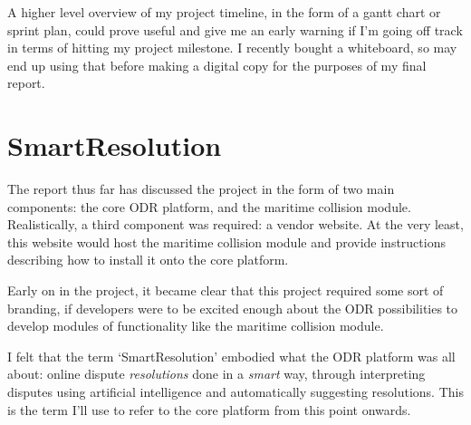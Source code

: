 A higher level overview of my project timeline, in the form of a gantt chart or sprint plan, could prove useful and give me an early warning if I'm going off track in terms of hitting my project milestone. I recently bought a whiteboard, so may end up using that before making a digital copy for the purposes of my final report.

\section{SmartResolution}

The report thus far has discussed the project in the form of two main components: the core ODR platform, and the maritime collision module. Realistically, a third component was required: a vendor website. At the very least, this website would host the maritime collision module and provide instructions describing how to install it onto the core platform.

Early on in the project, it became clear that this project required some sort of branding, if developers were to be excited enough about the ODR possibilities to develop modules of functionality like the maritime collision module.

I felt that the term `SmartResolution' embodied what the ODR platform was all about: online dispute \emph{resolutions} done in a \emph{smart} way, through interpreting disputes using artificial intelligence and automatically suggesting resolutions. This is the term I'll use to refer to the core platform from this point onwards.